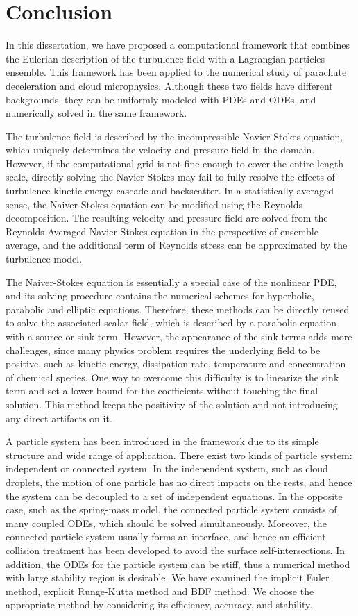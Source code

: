 \chapter{Conclusion}
In this dissertation, we have proposed a computational framework that combines
the Eulerian description of the turbulence field with a Lagrangian particles
ensemble.  This framework has been applied to the numerical study of parachute
deceleration and cloud microphysics. Although these two fields have different
backgrounds, they can be uniformly  modeled with PDEs and ODEs, and numerically
solved in the same framework.

The turbulence field is described by the incompressible Navier-Stokes equation,
which uniquely determines the velocity and pressure field in the domain.
However, if the computational grid is not fine enough to cover the entire
length scale, directly solving the Navier-Stokes may fail to fully resolve the
effects of turbulence kinetic-energy cascade and backscatter. In a
statistically-averaged sense, the Naiver-Stokes equation can be modified using
the Reynolds decomposition. The resulting velocity and pressure field are
solved from the Reynolds-Averaged Navier-Stokes equation in the perspective of
ensemble average, and the additional term of Reynolds stress can be
approximated by the turbulence model. 

The Naiver-Stokes equation is essentially a special case of the nonlinear PDE,
and its solving procedure contains the numerical schemes for hyperbolic,
parabolic and elliptic equations. Therefore, these methods can be directly
reused to solve the associated scalar field, which is described by a parabolic
equation with a source or sink term. However, the appearance of the sink terms
adds more challenges, since many physics problem requires the underlying field
to be positive, such as kinetic energy, dissipation rate, temperature and
concentration of chemical species. One way to overcome this difficulty is to
linearize the sink term and set a lower bound for the coefficients without
touching the final solution. This method keeps the positivity of the solution
and not introducing any direct artifacts on it.

A particle system has been introduced in the framework due to its simple
structure and wide range of application. There exist two kinds of particle
system: independent or connected system. In the independent system, such as
cloud droplets, the motion of one particle has no direct impacts on the rests,
and hence the system can be decoupled to a set of independent equations. In the
opposite case, such as the spring-mass model, the connected particle system
consists of many coupled ODEs, which should be solved simultaneously. Moreover,
the connected-particle system usually forms an interface, and hence an
efficient collision treatment has been developed to avoid the surface
self-intersections. In addition, the ODEs for the particle system can be stiff,
thus a numerical method with large stability region is desirable. We have
examined the implicit Euler method, explicit Runge-Kutta method and BDF method.
We choose the appropriate method by considering its efficiency, accuracy, and
stability.   


